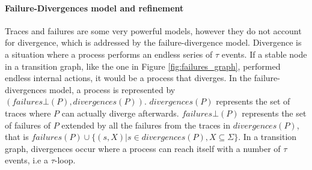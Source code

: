\paragraph{Failure-Divergences model and refinement}
Traces and failures are some very powerful models, however they do not account for divergence, which is addressed by the failure-divergence model. Divergence is a situation where a process performs an endless series of $\tau$ events. If a stable node in a transition graph, like the one in Figure \ref{fig:failures_graph}, performed endless internal actions, it would be a process that diverges. In the failure-divergences model, a process is represented by $(failures\bot(P), divergences(P))$. $divergences(P)$ represents the set of traces where $P$ can actually diverge afterwards. $failures\bot(P)$ represents the set of failures of $P$ extended by all the failures from the traces in $divergences(P)$, that is $failures(P) \cup \{(s,X) | s \in divergences(P), X \subseteq \Sigma\}$.
In a transition graph, divergences occur where a process can reach itself with a number of $\tau$ events, i.e a $\tau$-loop.